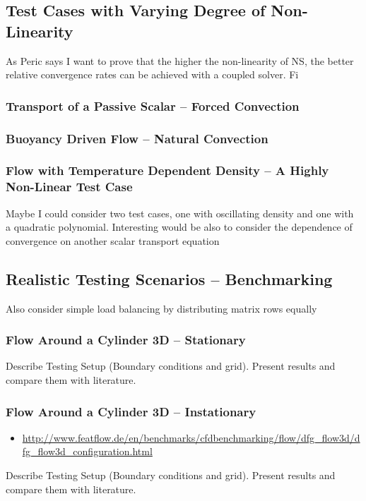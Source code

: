     \subsection{Test Cases with Varying Degree of Non-Linearity}
      
      As Peric says I want to prove that the higher the non-linearity of NS, the better relative convergence rates can be achieved with a coupled solver. Fi

      \subsubsection{Transport of a Passive Scalar -- Forced Convection}
      \subsubsection{Buoyancy Driven Flow -- Natural Convection}
      \subsubsection{Flow with Temperature Dependent Density -- A Highly Non-Linear Test Case}
        Maybe I could consider two test cases, one with oscillating density and one with a quadratic polynomial. Interesting would be also to consider the dependence of convergence on another scalar transport equation

    \subsection{Realistic Testing Scenarios -- Benchmarking}
        Also consider simple load balancing by distributing matrix rows equally
      
      \subsubsection{Flow Around a Cylinder 3D -- Stationary}
        Describe Testing Setup (Boundary conditions and grid). Present results and compare them with literature.
      \subsubsection{Flow Around a Cylinder 3D -- Instationary}
        \begin{itemize}
          \item\url{http://www.featflow.de/en/benchmarks/cfdbenchmarking/flow/dfg_flow3d/dfg_flow3d_configuration.html}
        \end{itemize}
        Describe Testing Setup (Boundary conditions and grid). Present results and compare them with literature.

